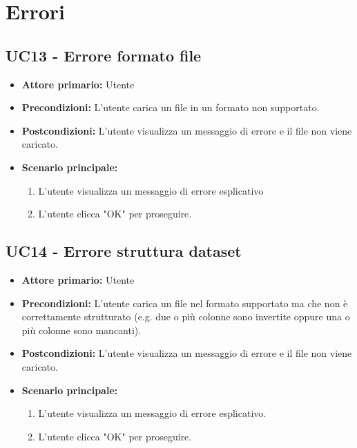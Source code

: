 \newpage


\section{Errori}
\subsection{UC13 - Errore formato file}
\label{sec:UC13 - Errore formato file}
\begin{itemize}
    \item \textbf{Attore primario:} Utente
    \item \textbf{Precondizioni:} L'utente carica un file in un formato non supportato.
    \item \textbf{Postcondizioni:} L'utente visualizza un messaggio di errore e il file non viene caricato.
    \item \textbf{Scenario principale:}
          \begin{enumerate}
              \item L'utente visualizza un messaggio di errore esplicativo
              \item L'utente clicca "OK" per proseguire.
          \end{enumerate}
\end{itemize}

\subsection{UC14 - Errore struttura dataset}
\label{sec:UC14 - Errore struttura dataset}
\begin{itemize}
    \item \textbf{Attore primario:} Utente
    \item \textbf{Precondizioni:} L'utente carica un file nel formato supportato ma che non è correttamente strutturato  
                                  (e.g. due o più colonne sono invertite oppure una o più colonne sono mancanti). 
    \item \textbf{Postcondizioni:} L'utente visualizza un messaggio di errore e il file non viene caricato.
    \item \textbf{Scenario principale:}
          \begin{enumerate}
              \item L'utente visualizza un messaggio di errore esplicativo.
              \item L'utente clicca "OK" per proseguire.
          \end{enumerate} 
\end{itemize}

